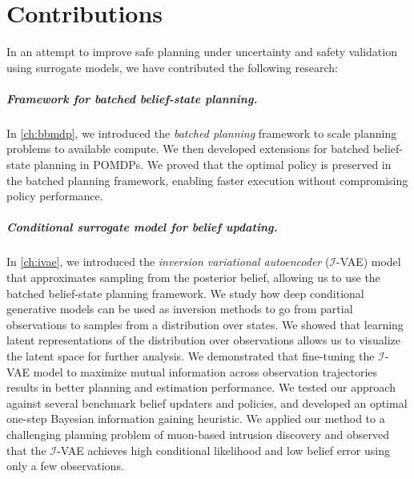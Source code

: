 \chapter{Contributions}\label{ch:contributions}

In an attempt to improve safe planning under uncertainty and safety validation using surrogate models, we have contributed the following research:

\paragraph{Framework for batched belief-state planning.}
In \cref{ch:bbmdp}, we introduced the \textit{batched planning} framework to scale planning problems to available compute.
We then developed extensions for batched belief-state planning in POMDPs.
We proved that the optimal policy is preserved in the batched planning framework, enabling faster execution without compromising policy performance.

\paragraph{Conditional surrogate model for belief updating.}
In \cref{ch:ivae}, we introduced the \textit{inversion variational autoencoder} ($\mathcal{I}$-VAE) model that approximates sampling from the posterior belief, allowing us to use the batched belief-state planning framework.
We study how deep conditional generative models can be used as inversion methods to go from partial observations to samples from a distribution over states.
We showed that learning latent representations of the distribution over observations allows us to visualize the latent space for further analysis.
We demonstrated that fine-tuning the $\mathcal{I}$-VAE model to maximize mutual information across observation trajectories results in better planning and estimation performance.
We tested our approach against several benchmark belief updaters and policies, and developed an optimal one-step Bayesian information gaining heuristic.
We applied our method to a challenging planning problem of muon-based intrusion discovery and observed that the $\mathcal{I}$-VAE achieves high conditional likelihood and low belief error using only a few observations.


